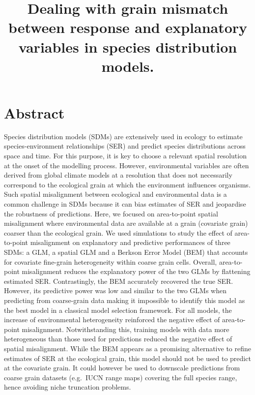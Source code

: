 \documentclass[
  12pt,
  a4paper]{article}
\title{Dealing with grain mismatch between response and explanatory variables in species distribution models.}
\author{}
\date{\vspace{-2.5em}}
\begin{document}
\maketitle

\hypertarget{abstract}{%
\section*{Abstract}\label{abstract}}

Species distribution models (SDMs) are extensively used in ecology to estimate species-environment relationships (SER) and predict species distributions across space and time. For this purpose, it is key to choose a relevant spatial resolution at the onset of the modelling process. However, environmental variables are often derived from global climate models at a resolution that does not necessarily correspond to the ecological grain at which the environment influences organisms. Such spatial misalignment between ecological and environmental data is a common challenge in SDMs because it can bias estimates of SER and jeopardise the robustness of predictions. Here, we focused on area-to-point spatial misalignment where environmental data are available at a grain (covariate grain) coarser than the ecological grain. We used simulations to study the effect of area-to-point misalignment on explanatory and predictive performances of three SDMs: a GLM, a spatial GLM and a Berkson Error Model (BEM) that accounts for covariate fine-grain heterogeneity within coarse grain cells. Overall, area-to-point misalignment reduces the explanatory power of the two GLMs by flattening estimated SER. Contrastingly, the BEM accurately recovered the true SER. However, its predictive power was low and similar to the two GLMs when predicting from coarse-grain data making it impossible to identify this model as the best model in a classical model selection framework. For all models, the increase of environmental heterogeneity reinforced the negative effect of area-to-point misalignment. Notwithstanding this, training models with data more heterogeneous than those used for predictions reduced the negative effect of spatial misalignment. While the BEM appears as a promising alternative to refine estimates of SER at the ecological grain, this model should not be used to predict at the covariate grain. It could however be used to downscale predictions from coarse grain datasets (e.g.~IUCN range maps) covering the full species range, hence avoiding niche truncation problems.
\end{document}
